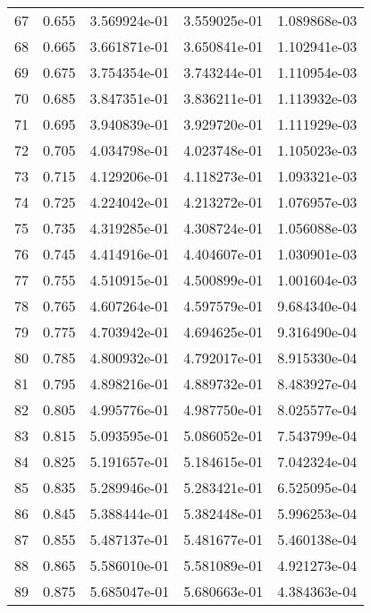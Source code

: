 \begin{table}[ht]
\begin{tabular}{rcccc}
    67 &  0.655 &    3.569924e-01 &    3.559025e-01  &     1.089868e-03\\ 
    68 &  0.665 &    3.661871e-01 &    3.650841e-01  &     1.102941e-03\\ 
    69 &  0.675 &    3.754354e-01 &    3.743244e-01  &     1.110954e-03\\ 
    70 &  0.685 &    3.847351e-01 &    3.836211e-01  &     1.113932e-03\\ 
    71 &  0.695 &    3.940839e-01 &    3.929720e-01  &     1.111929e-03\\ 
    72 &  0.705 &    4.034798e-01 &    4.023748e-01  &     1.105023e-03\\ 
    73 &  0.715 &    4.129206e-01 &    4.118273e-01  &     1.093321e-03\\ 
    74 &  0.725 &    4.224042e-01 &    4.213272e-01  &     1.076957e-03\\ 
    75 &  0.735 &    4.319285e-01 &    4.308724e-01  &     1.056088e-03\\ 
    76 &  0.745 &    4.414916e-01 &    4.404607e-01  &     1.030901e-03\\ 
    77 &  0.755 &    4.510915e-01 &    4.500899e-01  &     1.001604e-03\\ 
    78 &  0.765 &    4.607264e-01 &    4.597579e-01  &     9.684340e-04\\ 
    79 &  0.775 &    4.703942e-01 &    4.694625e-01  &     9.316490e-04\\ 
    80 &  0.785 &    4.800932e-01 &    4.792017e-01  &     8.915330e-04\\ 
    81 &  0.795 &    4.898216e-01 &    4.889732e-01  &     8.483927e-04\\ 
    82 &  0.805 &    4.995776e-01 &    4.987750e-01  &     8.025577e-04\\ 
    83 &  0.815 &    5.093595e-01 &    5.086052e-01  &     7.543799e-04\\ 
    84 &  0.825 &    5.191657e-01 &    5.184615e-01  &     7.042324e-04\\ 
    85 &  0.835 &    5.289946e-01 &    5.283421e-01  &     6.525095e-04\\ 
    86 &  0.845 &    5.388444e-01 &    5.382448e-01  &     5.996253e-04\\ 
    87 &  0.855 &    5.487137e-01 &    5.481677e-01  &     5.460138e-04\\ 
    88 &  0.865 &    5.586010e-01 &    5.581089e-01  &     4.921273e-04\\ 
    89 &  0.875 &    5.685047e-01 &    5.680663e-01  &     4.384363e-04\\ 

\end{tabular}
\end{table}
